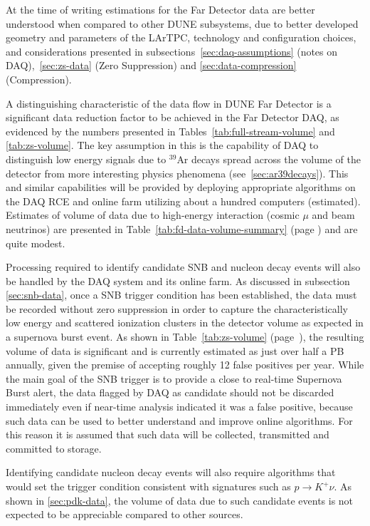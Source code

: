 At the time of writing estimations for the Far Detector data are better understood when compared to other DUNE subsystems,
due to better developed geometry and parameters of the LArTPC, technology and configuration choices, and considerations
presented in subsections~\ref{sec:daq-assumptions} (notes on DAQ),~\ref{sec:zs-data} (Zero Suppression) and \ref{sec:data-compression} (Compression).

A distinguishing characteristic of the data flow in DUNE Far Detector is a significant data reduction factor to be achieved
in the Far Detector DAQ, as evidenced by the numbers presented in Tables~\ref{tab:full-stream-volume} and \ref{tab:zs-volume}.
The key assumption in this is the capability of DAQ to distinguish low energy signals  due to $^{39}$Ar decays spread
across the volume of the detector from more interesting physics phenomena (see~\ref{sec:ar39decays}).
This and similar capabilities will be provided
by deploying appropriate algorithms on the DAQ RCE and online farm utilizing about a hundred computers (estimated).
Estimates of volume of data due to high-energy interaction (cosmic $\mu$ and beam neutrinos) are presented in
Table~\ref{tab:fd-data-volume-summary} (page \pageref{tab:fd-data-volume-summary}) and are quite modest.

Processing required to identify candidate SNB and nucleon decay events will also be handled by the DAQ system and its online farm.
As discussed in subsection \ref{sec:snb-data}, once a SNB trigger condition has been established, the data must
be recorded without zero suppression in order to capture the characteristically low energy and scattered ionization
clusters in the detector volume as expected in a supernova burst event. As shown in Table~\ref{tab:zs-volume} (page~\pageref{tab:zs-volume}),
the resulting volume of data is significant and is currently estimated as just over half a PB annually, given the premise of accepting roughly
12 false positives per year. While the main goal of the SNB trigger is to provide a close to real-time Supernova Burst alert, the data
flagged by DAQ as candidate should not be discarded immediately even if near-time analysis indicated it was a false positive,
because such data can be used to better understand and improve online algorithms. For this reason it is assumed that
such data will be collected, transmitted and committed to storage.

Identifying candidate nucleon decay events will also require algorithms that would set the trigger condition consistent
with signatures such as $p \rightarrow K^+\nu$. As shown in \ref{sec:pdk-data}, the volume of data due to such candidate
events is not expected to be appreciable compared to other sources.

